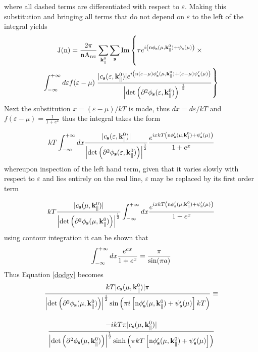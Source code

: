 \documentclass[a4paper, 12pt]{article}
\begin{document}
	where all dashed terms are differentiated with respect to $\varepsilon$.
Making this substitution and bringing all terms that do not depend on $\varepsilon$ to the left of the integral yields
\begin{multline}
	{\rm J(n)} = \frac{2\pi}{\rm nA_{\scriptscriptstyle BZ}}\sum_{{\bf k}_{\parallel}^0}\sum_{\bf s} {\rm Im}\left\{\tau e^{i\left({\rm n}\phi_{\bf s}(\mu, {\bf k}_\parallel^0)+\psi_{\bf s}(\mu)\right)} \times \rule{0cm}{0.8cm}\right.\\ \int_{-\infty}^{+\infty}d\varepsilon f(\varepsilon - \mu)\left. \frac{|c_{\bf s}(\varepsilon, {\bf k}_\parallel^0)|e^{i\left( {\rm n} (\varepsilon - \mu)\phi_{\bf s}'(\mu, {\bf k}_\parallel^0) + (\varepsilon - \mu)\psi_{\bf s}'(\mu)\right)} }{\left|{\rm det}\left(\partial^2\phi_{\bf s}(\varepsilon, {\bf k}_\parallel^0)\right)\right|^{\frac{1}{2}}}\right\}
\end{multline}
Next the substitution $x=(\varepsilon - \mu)/kT$ is made, thus $dx = d\varepsilon/kT$ and $f(\varepsilon - \mu)=\frac{1}{1+e^x}$
thus the integral takes the form
\begin{equation}
	kT\int_{-\infty}^{+\infty}dx \frac{|c_{\bf s}(\varepsilon, {\bf k}_\parallel^0)|}{\left|{\rm det}\left(\partial^2\phi_{\bf s}(\varepsilon, {\bf k}_\parallel^0)\right)\right|^\frac{1}{2}} \rule{0cm}{0.8cm} \frac{e^{ixkT\left({\rm n}\phi_{\bf s}'(\mu, {\bf k}_\parallel^0)+\psi_{\bf s}'(\mu)\right)}}{1+e^x}
\end{equation}
whereupon inspection of the left hand term, given that it varies slowly with respect to $\varepsilon$ and lies entirely on the real line, $\varepsilon$ may be replaced by its first order term
\begin{equation}\label{dodgy}
	kT\frac{|c_{\bf s}(\mu, {\bf k}_\parallel^0)|}{\left|{\rm det}\left(\partial^2\phi_{\bf s}(\mu, {\bf k}_\parallel^0)\right)\right|^\frac{1}{2}}\rule{0cm}{0.8cm} \int_{-\infty}^{+\infty}dx \frac{e^{ixkT\left({\rm n}\phi_{\bf s}'(\mu, {\bf k}_\parallel^0)+\psi_{\bf s}'(\mu)\right)}}{1+e^x}
\end{equation}
using contour integration it can be shown that{}
\begin{equation}
	\int_{-\infty}^{+\infty} dx \frac{e^{ax}}{1+e^x} = \frac{\pi}{{\rm sin}(\pi a)}
\end{equation}
Thus Equation \eqref{dodgy} becomes
	\begin{multline}
		\frac{kT|c_{\bf s}(\mu, {\bf k}_\parallel^0)|\pi}{\left|{\rm det}\left(\partial^2\phi_{\bf s}(\mu,{\bf k}_\parallel^0)\right)\right|^\frac{1}{2} {\rm sin}\left(\pi i\left[{\rm n}\phi_{\bf s}'(\mu, {\bf k}_\parallel^0)+\psi_{\bf s}'(\mu)\right]kT\right)}\equiv\\\rule{0cm}{1cm} \frac{-ikT\pi|c_{\bf s}(\mu, {\bf k}_\parallel^0)|}{\left|{\rm det}\left(\partial^2\phi_{\bf s}(\mu,{\bf k}_\parallel^0)\right)\right|^\frac{1}{2} {\rm sinh}\left(\pi kT\left[{\rm n}\phi_{\bf s}'(\mu, {\bf k}_\parallel^0)+\psi_{\bf s}'(\mu)\right]\right)}
\end{multline}
\end{document}
